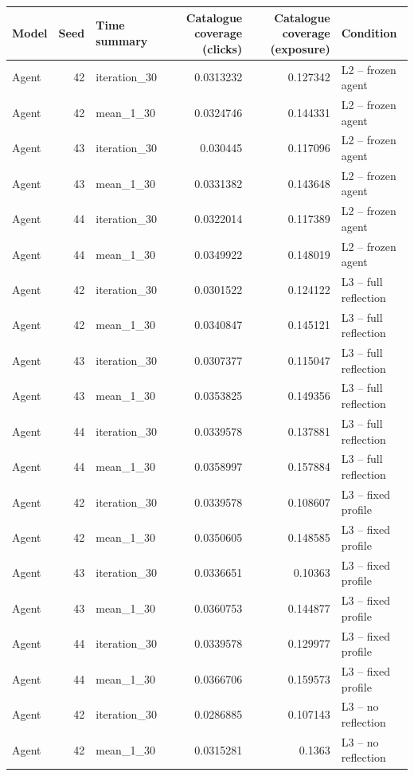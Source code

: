 \begin{table}[htbp!]
\centering
\small
\setlength{\tabcolsep}{3pt}
\renewcommand{\arraystretch}{1.1}
\begin{tabular}{lrlrrl}
\hline
Model & Seed & Time summary & Catalogue coverage (clicks) & Catalogue coverage (exposure) & Condition \\
\hline
Agent & 42 & iteration\_30 & 0.0313232 & 0.127342 & L2 -- frozen agent \\
Agent & 42 & mean\_1\_30 & 0.0324746 & 0.144331 & L2 -- frozen agent \\
Agent & 43 & iteration\_30 & 0.030445 & 0.117096 & L2 -- frozen agent \\
Agent & 43 & mean\_1\_30 & 0.0331382 & 0.143648 & L2 -- frozen agent \\
Agent & 44 & iteration\_30 & 0.0322014 & 0.117389 & L2 -- frozen agent \\
Agent & 44 & mean\_1\_30 & 0.0349922 & 0.148019 & L2 -- frozen agent \\
Agent & 42 & iteration\_30 & 0.0301522 & 0.124122 & L3 -- full reflection \\
Agent & 42 & mean\_1\_30 & 0.0340847 & 0.145121 & L3 -- full reflection \\
Agent & 43 & iteration\_30 & 0.0307377 & 0.115047 & L3 -- full reflection \\
Agent & 43 & mean\_1\_30 & 0.0353825 & 0.149356 & L3 -- full reflection \\
Agent & 44 & iteration\_30 & 0.0339578 & 0.137881 & L3 -- full reflection \\
Agent & 44 & mean\_1\_30 & 0.0358997 & 0.157884 & L3 -- full reflection \\
Agent & 42 & iteration\_30 & 0.0339578 & 0.108607 & L3 -- fixed profile \\
Agent & 42 & mean\_1\_30 & 0.0350605 & 0.148585 & L3 -- fixed profile \\
Agent & 43 & iteration\_30 & 0.0336651 & 0.10363 & L3 -- fixed profile \\
Agent & 43 & mean\_1\_30 & 0.0360753 & 0.144877 & L3 -- fixed profile \\
Agent & 44 & iteration\_30 & 0.0339578 & 0.129977 & L3 -- fixed profile \\
Agent & 44 & mean\_1\_30 & 0.0366706 & 0.159573 & L3 -- fixed profile \\
Agent & 42 & iteration\_30 & 0.0286885 & 0.107143 & L3 -- no reflection \\
Agent & 42 & mean\_1\_30 & 0.0315281 & 0.1363 & L3 -- no reflection \\

\end{tabular}
\end{table}
